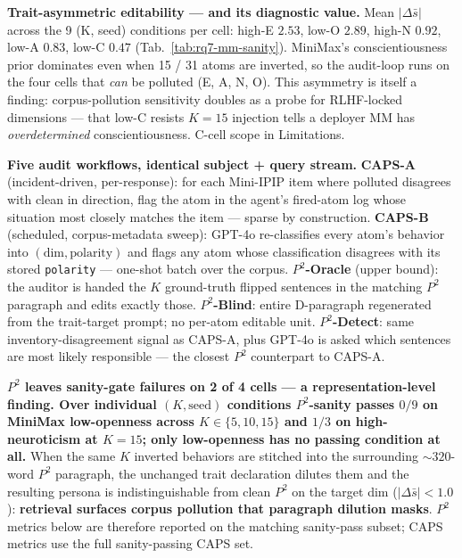 \textbf{Trait-asymmetric editability --- and its diagnostic value.} Mean $|\Delta\bar{s}|$ across the 9 (K, seed) conditions per cell: high-E $2.53$, low-O $2.89$, high-N $0.92$, low-A $0.83$, low-C $0.47$ (Tab.~\ref{tab:rq7-mm-sanity}). MiniMax's conscientiousness prior dominates even when 15 / 31 atoms are inverted, so the audit-loop runs on the four cells that \textit{can} be polluted (E, A, N, O). This asymmetry is itself a finding: corpus-pollution sensitivity doubles as a probe for RLHF-locked dimensions --- that low-C resists $K=15$ injection tells a deployer MM has \textit{overdetermined} conscientiousness. C-cell scope in Limitations.

\textbf{Five audit workflows, identical subject + query stream.} \textbf{CAPS-A} (incident-driven, per-response): for each Mini-IPIP item where polluted disagrees with clean in direction, flag the atom in the agent's fired-atom log whose situation most closely matches the item --- sparse by construction. \textbf{CAPS-B} (scheduled, corpus-metadata sweep): GPT-4o re-classifies every atom's behavior into $(\text{dim}, \text{polarity})$ and flags any atom whose classification disagrees with its stored \texttt{polarity} --- one-shot batch over the corpus. \textbf{$P^{\!2}$-Oracle} (upper bound): the auditor is handed the $K$ ground-truth flipped sentences in the matching $P^{\!2}$ paragraph and edits exactly those. \textbf{$P^{\!2}$-Blind}: entire D-paragraph regenerated from the trait-target prompt; no per-atom editable unit. \textbf{$P^{\!2}$-Detect}: same inventory-disagreement signal as CAPS-A, plus GPT-4o is asked which sentences are most likely responsible --- the closest $P^{\!2}$ counterpart to CAPS-A.

\textbf{$P^{\!2}$ leaves sanity-gate failures on 2 of 4 cells --- a representation-level finding. Over individual $(K, \text{seed})$ conditions $P^{\!2}$-sanity passes $0/9$ on MiniMax low-openness across $K \in \{5, 10, 15\}$ and $1/3$ on high-neuroticism at $K = 15$; only low-openness has no passing condition at all.} When the same $K$ inverted behaviors are stitched into the surrounding $\sim 320$-word $P^{\!2}$ paragraph, the unchanged trait declaration dilutes them and the resulting persona is indistinguishable from clean $P^{\!2}$ on the target dim ($|\Delta\bar{s}| < 1.0$): \textbf{retrieval surfaces corpus pollution that paragraph dilution masks}. $P^{\!2}$ metrics below are therefore reported on the matching sanity-pass subset; CAPS metrics use the full sanity-passing CAPS set.

